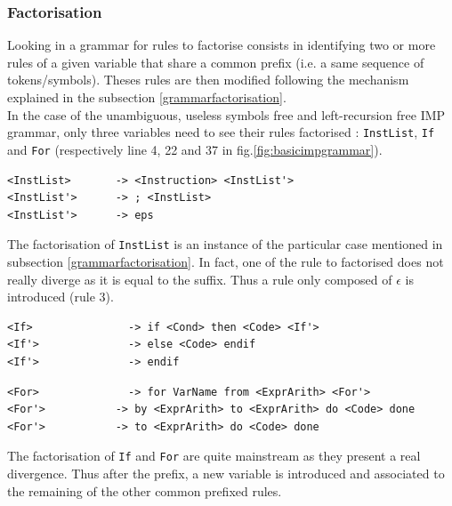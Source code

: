 \documentclass[a4paper,11pt]{article}
\begin{document}
    \subsubsection{Factorisation}
      Looking in a grammar for rules to factorise consists in identifying two or more rules of a given variable that share a common prefix (i.e. a same sequence of tokens/symbols). Theses rules are then modified following the mechanism explained in the subsection \ref{grammarfactorisation}.\\
      In the case of the unambiguous, useless symbols free and left-recursion free IMP grammar, only three variables need to see their rules factorised : \verb|InstList|, \verb|If| and \verb|For| (respectively line 4, 22 and 37 in fig.\ref{fig:basicimpgrammar}).
      \begin{lstlisting}
<InstList>	     -> <Instruction> <InstList'> 
<InstList'>	     -> ; <InstList> 
<InstList'>	     -> eps\end{lstlisting}
      The factorisation of \verb|InstList| is an instance of the particular case mentioned in subsection \ref{grammarfactorisation}. In fact, one of the rule to factorised does not really diverge as it is equal to the suffix. Thus a rule only composed of $\epsilon$ is introduced (rule 3).
      \begin{lstlisting}
<If>	           -> if <Cond> then <Code> <If'> 
<If'>	           -> else <Code> endif 
<If'>	           -> endif\end{lstlisting}
      \begin{lstlisting}
<For>	           -> for VarName from <ExprArith> <For'> 
<For'>	         -> by <ExprArith> to <ExprArith> do <Code> done 
<For'>	         -> to <ExprArith> do <Code> done\end{lstlisting}
      The factorisation of \verb|If| and \verb|For| are quite mainstream as they present a real divergence. Thus after the prefix,  a new variable is introduced and associated to the remaining of the other common prefixed rules.
    
\end{document}
